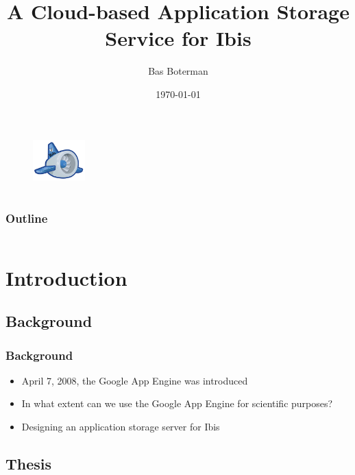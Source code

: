 \documentclass{beamer}
\title{A Cloud-based Application Storage Service \newline for Ibis}
\author{Bas Boterman}
\date{\today}
\begin{document}
\frame
{
	\titlepage
	\begin{figure}[h]
	\begin{center}
	\includegraphics[width=2cm]{msc_logo.png} 
	\end{center}
	\end{figure}
}

\section[Outline]{}
\frame
{
	\frametitle{Outline}
	\begin{columns}
	\begin{column}{0.5\textwidth}
		\tableofcontents[sections={1-3}]
	\end{column}
	\begin{column}{0.5\textwidth}
		\tableofcontents[sections={4-6}]
	\end{column}
	\end{columns}
}

\section{Introduction}
\subsection{Background}
\frame
{
	\frametitle{Background}
	\begin{itemize}
    	\item <1->April 7, 2008, the Google App Engine was introduced
    	\item <2->In what extent can we use the Google App Engine for scientific
      		purposes?
    	\item <3->Designing an application storage server for Ibis
    \end{itemize}
}


\subsection{Thesis}

\end{document}
